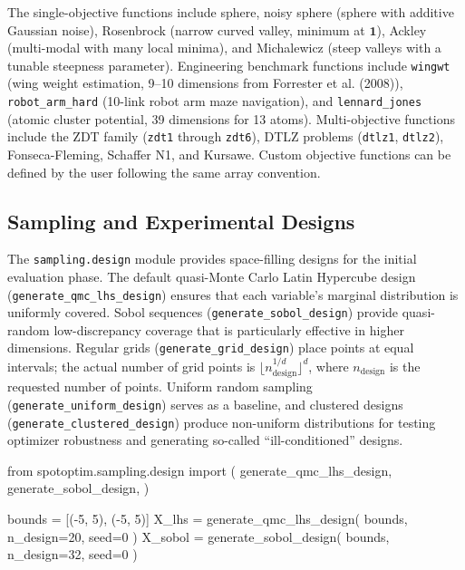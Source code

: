 \documentclass[
  twocolumn]{article}
\newenvironment{Shaded}{\begin{snugshade}}{\end{snugshade}}
\newcommand{\DecValTok}[1]{\textcolor[rgb]{0.68,0.00,0.00}{#1}}
\newcommand{\ImportTok}[1]{\textcolor[rgb]{0.00,0.46,0.62}{#1}}
\newcommand{\NormalTok}[1]{\textcolor[rgb]{0.00,0.23,0.31}{#1}}
\newcommand{\OperatorTok}[1]{\textcolor[rgb]{0.37,0.37,0.37}{#1}}
\begin{document}
The single-objective functions include sphere, noisy sphere (sphere with
additive Gaussian noise), Rosenbrock (narrow curved valley, minimum at
\(\mathbf{1}\)), Ackley (multi-modal with many local minima), and
Michalewicz (steep valleys with a tunable steepness parameter).
Engineering benchmark functions include \texttt{wingwt} (wing weight
estimation, 9--10 dimensions from Forrester et al. (2008)),
\texttt{robot\_arm\_hard} (10-link robot arm maze navigation), and
\texttt{lennard\_jones} (atomic cluster potential, 39 dimensions for 13
atoms). Multi-objective functions include the ZDT family (\texttt{zdt1}
through \texttt{zdt6}), DTLZ problems (\texttt{dtlz1}, \texttt{dtlz2}),
Fonseca-Fleming, Schaffer N1, and Kursawe. Custom objective functions
can be defined by the user following the same array convention.

\subsection{Sampling and Experimental Designs}\label{sec-sampling}

The \texttt{sampling.design} module provides space-filling designs for
the initial evaluation phase. The default quasi-Monte Carlo Latin
Hypercube design (\texttt{generate\_qmc\_lhs\_design}) ensures that each
variable's marginal distribution is uniformly covered. Sobol sequences
(\texttt{generate\_sobol\_design}) provide quasi-random low-discrepancy
coverage that is particularly effective in higher dimensions. Regular
grids (\texttt{generate\_grid\_design}) place points at equal intervals;
the actual number of grid points is
\(\lfloor n_\text{design}^{1/d} \rfloor^d\), where \(n_\text{design}\)
is the requested number of points. Uniform random sampling
(\texttt{generate\_uniform\_design}) serves as a baseline, and clustered
designs (\texttt{generate\_clustered\_design}) produce non-uniform
distributions for testing optimizer robustness and generating so-called
``ill-conditioned'' designs.

\begin{Shaded}
\begin{Highlighting}[]
\ImportTok{from}\NormalTok{ spotoptim.sampling.design }\ImportTok{import}\NormalTok{ (}
\NormalTok{    generate\_qmc\_lhs\_design,}
\NormalTok{    generate\_sobol\_design,}
\NormalTok{)}

\NormalTok{bounds }\OperatorTok{=}\NormalTok{ [(}\OperatorTok{{-}}\DecValTok{5}\NormalTok{, }\DecValTok{5}\NormalTok{), (}\OperatorTok{{-}}\DecValTok{5}\NormalTok{, }\DecValTok{5}\NormalTok{)]}
\NormalTok{X\_lhs }\OperatorTok{=}\NormalTok{ generate\_qmc\_lhs\_design(}
\NormalTok{    bounds, n\_design}\OperatorTok{=}\DecValTok{20}\NormalTok{, seed}\OperatorTok{=}\DecValTok{0}
\NormalTok{)}
\NormalTok{X\_sobol }\OperatorTok{=}\NormalTok{ generate\_sobol\_design(}
\NormalTok{    bounds, n\_design}\OperatorTok{=}\DecValTok{32}\NormalTok{, seed}\OperatorTok{=}\DecValTok{0}
\NormalTok{)}
\end{Highlighting}
\end{Shaded}
\end{document}
